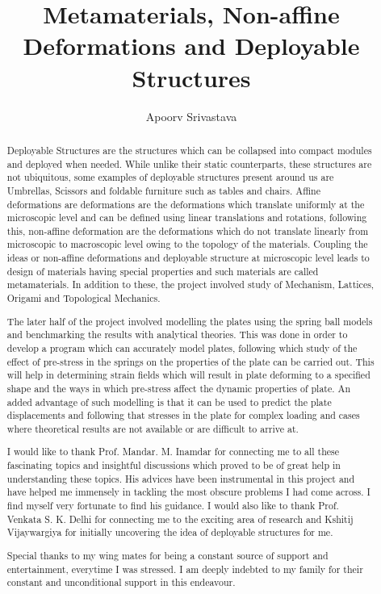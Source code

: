 \documentclass[a4paper, twoside]{report}
\title{Metamaterials, Non-affine Deformations and Deployable Structures}
\author{Apoorv Srivastava}
\begin{document}


\begin{abstract}
Deployable Structures are the structures which can be collapsed into compact modules and deployed when needed. While unlike their static counterparts, these structures are not ubiquitous, some examples of deployable structures present around us are Umbrellas, Scissors and foldable furniture such as tables and chairs. Affine deformations are deformations are the deformations which translate uniformly at the microscopic level and can be defined using linear translations and rotations, following this, non-affine deformation are the deformations which do not translate linearly from microscopic to macroscopic level owing to the topology of the materials. Coupling the ideas or non-affine deformations and deployable structure at microscopic level leads to design of materials having special properties and such materials are called metamaterials. In addition to these, the project involved study of Mechanism, Lattices, Origami and Topological Mechanics.\vspace{8 pt}


The later half of the project involved modelling the plates using the spring ball models and benchmarking the results with analytical theories. This was done in order to develop a program which can accurately model plates, following which study of the effect of pre-stress in the springs on the properties of the plate can be carried out. This will help in determining strain fields which will result in plate deforming to a specified shape and the ways in which pre-stress affect the dynamic properties of plate. An added advantage of such modelling is that it can be used to predict the plate displacements and following that stresses in the plate for complex loading and cases where theoretical results are not available or are difficult to arrive at.


\end{abstract}

\renewcommand{\abstractname}{Acknowledgments}
\begin{abstract}
I would like to thank Prof. Mandar. M. Inamdar for connecting me to all these fascinating topics and insightful discussions which proved to be of great help in understanding these topics. His advices have been instrumental in this project and have helped me immensely in tackling the most obscure problems I had come across. I find myself very fortunate to find his guidance. I would also like to thank Prof. Venkata S. K. Delhi for connecting me to the exciting area of research and Kshitij Vijaywargiya for initially uncovering the idea of deployable structures for me. \vspace{8 pt}

Special thanks to my wing mates for being a constant source of support and entertainment, everytime I was stressed. I am deeply indebted to my family for their constant and unconditional support in this endeavour.
\end{abstract}
\end{document}
